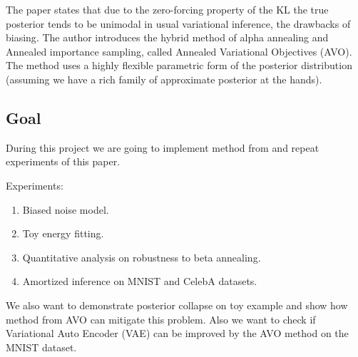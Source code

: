 \documentclass[a4paper]{article}
\begin{document}
The paper \cite{main_Huang2018ImprovingEI} states that due to the zero-forcing property of the KL the true posterior tends to be unimodal in usual variational inference, {the drawbacks of biasing}.
The author introduces the hybrid method of alpha annealing and Annealed importance sampling, called Annealed Variational Objectives (AVO). The method uses a highly flexible parametric form of the posterior distribution (assuming we have a rich family of approximate posterior at the hands). %



\subsection*{Goal}
During this project we are going to implement method from \cite{main_Huang2018ImprovingEI} and repeat experiments of this paper. 

Experiments:
\begin{enumerate}
    \item Biased noise model.
    \item Toy energy fitting.
    \item Quantitative analysis on robustness to beta annealing.
    \item Amortized inference on MNIST and CelebA datasets.
\end{enumerate}

We also want to demonstrate posterior collapse on toy example and show how method from AVO \cite{main_Huang2018ImprovingEI} can mitigate this problem. Also we want to check if Variational Auto Encoder (VAE) can be improved by the AVO method on the MNIST dataset.
\end{document}
